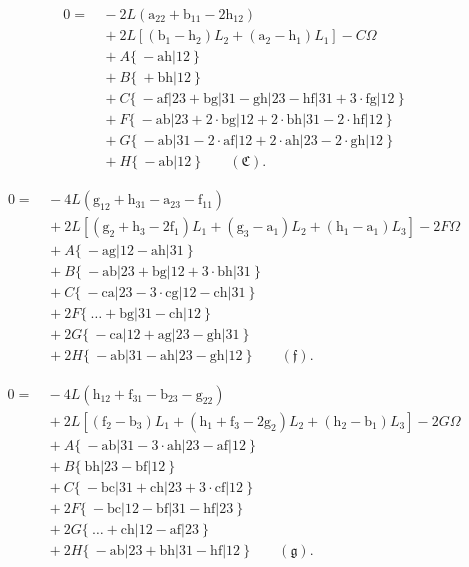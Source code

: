 \documentclass[11pt,a4paper]{article}
\begin{document}
\begin{align*}
0 = &\,-2L(\text{a}_{22} + \text{b}_{11} - 2\text{h}_{12})\\
    &\,+ 2L[(\text{b}_{1} - \text{h}_{2})L_{2} + (\text{a}_{2} - \text{h}_{1})L_{1}] - C\Omega\\
    &\,+ A\{\ -\text{ah}|12\ \}\\
    &\,+ B\{\ +\text{bh}|12\ \}\\
    &\,+ C\{\ -\text{af}|23 + \text{bg}|31 - \text{gh}|23 - \text{hf}|31 + 3\cdot\text{fg}|12\ \}\\
    &\,+ F\{\ -\text{ab}|23 + 2\cdot\text{bg}|12 + 2\cdot\text{bh}|31 - 2\cdot\text{hf}|12\ \}\\
    &\,+ G\{\ -\text{ab}|31 - 2\cdot\text{af}|12 + 2\cdot\text{ah}|23 - 2\cdot\text{gh}|12\ \}\\
    &\,+ H\{\ -\text{ab}|12\ \}\qquad(\mathfrak{C}).
\end{align*}

\begin{align*}
0 = &\,-4L(\text{g}_{12} + \text{h}_{31} - \text{a}_{23} - \text{f}_{11})\\
    &\,+ 2L[(\text{g}_{2} + \text{h}_{3} - 2\text{f}_{1})L_{1} + (\text{g}_{3} - \text{a}_{1})L_{2} + (\text{h}_{1} - \text{a}_{1})L_{3}] - 2F\Omega\\
    &\,+ A\{\ -\text{ag}|12 - \text{ah}|31\ \}\\
    &\,+ B\{\ -\text{ab}|23 + \text{bg}|12 + 3\cdot\text{bh}|31\ \}\\
    &\,+ C\{\ -\text{ca}|23 - 3\cdot\text{cg}|12 - \text{ch}|31\ \}\\
    &\,+ 2F\{\ \ldots + \text{bg}|31 - \text{ch}|12\ \}\\
    &\,+ 2G\{\ -\text{ca}|12 + \text{ag}|23 - \text{gh}|31\ \}\\
    &\,+ 2H\{\ -\text{ab}|31 - \text{ah}|23 - \text{gh}|12\ \}\qquad(\mathfrak{f}).
\end{align*}

\begin{align*}
0 = &\,-4L(\text{h}_{12} + \text{f}_{31} - \text{b}_{23} - \text{g}_{22})\\
    &\,+ 2L[(\text{f}_{2} - \text{b}_{3})L_{1} + (\text{h}_{1} + \text{f}_{3} - 2\text{g}_{2})L_{2} + (\text{h}_{2} - \text{b}_{1})L_{3}] - 2G\Omega\\
    &\,+ A\{\ -\text{ab}|31 - 3\cdot\text{ah}|23 - \text{af}|12\ \}\\
    &\,+ B\{\ \text{bh}|23 - \text{bf}|12\ \}\\
    &\,+ C\{\ -\text{bc}|31 + \text{ch}|23 + 3\cdot\text{cf}|12\ \}\\
    &\,+ 2F\{\ -\text{bc}|12 - \text{bf}|31 - \text{hf}|23\ \}\\
    &\,+ 2G\{\ \ldots + \text{ch}|12 - \text{af}|23\ \}\\
    &\,+ 2H\{\ -\text{ab}|23 + \text{bh}|31 - \text{hf}|12\ \}\qquad(\mathfrak{g}).
\end{align*}
\clearpage
\end{document}
